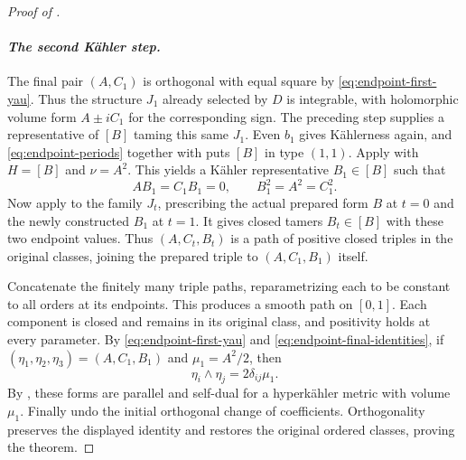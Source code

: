\begin{proof}[Proof of ]
\paragraph{\emph{The second K\"ahler step.}}
The final pair $(A,C_1)$ is orthogonal with equal square by
\eqref{eq:endpoint-first-yau}.  Thus the structure $J_1$ already
selected by $D$ is integrable, with holomorphic volume form
$A\pm iC_1$ for the corresponding sign.  The preceding step supplies
a representative of $[B]$ taming this same $J_1$.  Even $b_1$ gives
K\"ahlerness again, and \eqref{eq:endpoint-periods} together with
 puts $[B]$ in type $(1,1)$.
Apply  with $H=[B]$ and $\nu=A^2$.
This yields a K\"ahler representative $B_1\in[B]$ such that
\begin{equation}\label{eq:endpoint-final-identities}
 AB_1=C_1B_1=0,\qquad B_1^2=A^2=C_1^2.
\end{equation}
Now apply  to the family $J_t$, prescribing
the actual prepared form $B$ at $t=0$ and the newly constructed
$B_1$ at $t=1$.  It gives closed tamers $B_t\in[B]$ with these two
endpoint values.  Thus $(A,C_t,B_t)$ is a path of positive closed
triples in the original classes, joining the prepared triple to
$(A,C_1,B_1)$ itself.

Concatenate the finitely many triple paths, reparametrizing each to be
constant to all orders at its endpoints. This produces a smooth path
on $[0,1]$. Each component is closed and remains in its original
class, and positivity holds at every parameter. By
\eqref{eq:endpoint-first-yau} and
\eqref{eq:endpoint-final-identities}, if
$(\eta_1,\eta_2,\eta_3)=(A,C_1,B_1)$ and $\mu_1=A^2/2$, then
\[
 \eta_i\wedge\eta_j=2\delta_{ij}\mu_1.
\]
By , these forms are parallel and
self-dual for a hyperk\"ahler metric with volume $\mu_1$.
Finally undo the initial orthogonal change of coefficients.
Orthogonality preserves the displayed identity and restores the
original ordered classes, proving the theorem.
\end{proof}

